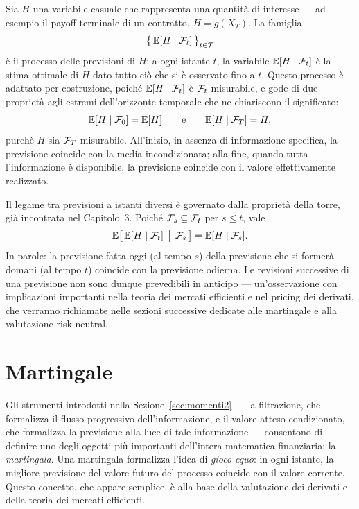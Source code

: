 Sia $H$ una variabile casuale che rappresenta una quantit\`{a} di
interesse --- ad esempio il payoff terminale di un contratto,
$H=g(X_T)$. La famiglia
\[
\bigl\{\,\mathbb{E}[H\mid\mathcal{F}_t]\,\bigr\}_{t\in\mathcal{T}}
\]
\`{e} il processo delle previsioni di $H$: a ogni istante $t$, la
variabile $\mathbb{E}[H\mid\mathcal{F}_t]$ \`{e} la stima ottimale di $H$ dato tutto
ci\`{o} che si \`{e} osservato fino a $t$. Questo processo \`{e}
adattato per costruzione, poich\'{e} $\mathbb{E}[H\mid\mathcal{F}_t]$ \`{e}
$\mathcal{F}_t$-misurabile, e gode di due propriet\`{a} agli estremi
dell'orizzonte temporale che ne chiariscono il significato:
\[
\mathbb{E}[H\mid\mathcal{F}_0]=\mathbb{E}[H]
\qquad\text{e}\qquad
\mathbb{E}[H\mid\mathcal{F}_T]=H,
\]
purch\`{e} $H$ sia $\mathcal{F}_T$-misurabile. All'inizio, in assenza di
informazione specifica, la previsione coincide con la media
incondizionata; alla fine, quando tutta l'informazione \`{e}
disponibile, la previsione coincide con il valore effettivamente
realizzato.

Il legame tra previsioni a istanti diversi \`{e} governato dalla
propriet\`{a} della torre, gi\`{a} incontrata nel Capitolo~3. Poich\'{e}
$\mathcal{F}_s\subseteq\mathcal{F}_t$ per $s\leq t$, vale
\[
\mathbb{E}\bigl[\,\mathbb{E}[H\mid\mathcal{F}_t]\,\bigm|\,\mathcal{F}_s\,\bigr]=\mathbb{E}[H\mid\mathcal{F}_s].
\]
In parole: la previsione fatta oggi (al tempo $s$) della previsione
che si former\`{a} domani (al tempo $t$) coincide con la previsione
odierna. Le revisioni successive di una previsione non sono dunque
prevedibili in anticipo --- un'osservazione con implicazioni
importanti nella teoria dei mercati efficienti e nel pricing dei
derivati, che verranno richiamate nelle sezioni successive dedicate
alle martingale e alla valutazione risk-neutral.


\section{Martingale}
\label{sec:martingale}

Gli strumenti introdotti nella Sezione~\ref{sec:momenti2} ---
la filtrazione, che formalizza il flusso progressivo
dell'informazione, e il valore atteso condizionato, che
formalizza la previsione alla luce di tale informazione ---
consentono di definire uno degli oggetti pi\`{u} importanti
dell'intera matematica finanziaria: la \emph{martingala}. Una
martingala formalizza l'idea di \emph{gioco equo}: in ogni
istante, la migliore previsione del valore futuro del processo
coincide con il valore corrente. Questo concetto, che appare
semplice, \`{e} alla base della valutazione dei derivati e
della teoria dei mercati efficienti.

